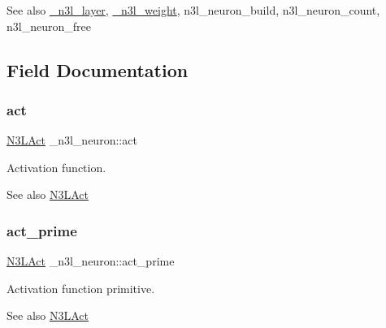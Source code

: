 \begin{DoxySeeAlso}{See also}
\hyperlink{struct__n3l__layer}{\+\_\+n3l\+\_\+layer}, \hyperlink{struct__n3l__weight}{\+\_\+n3l\+\_\+weight}, n3l\+\_\+neuron\+\_\+build, n3l\+\_\+neuron\+\_\+count, n3l\+\_\+neuron\+\_\+free 
\end{DoxySeeAlso}


\subsection{Field Documentation}
\mbox{\label{struct__n3l__neuron_a3ed17ddbe86d42ed6b7d31256b109262}} 
\subsubsection{\texorpdfstring{act}{act}}
{\footnotesize\ttfamily \hyperlink{n3__header_8h_afb10e6f7012513b51225a4d3add36cae}{N3\+L\+Act} \+\_\+n3l\+\_\+neuron\+::act}

Activation function. \begin{DoxySeeAlso}{See also}
\hyperlink{n3__header_8h_afb10e6f7012513b51225a4d3add36cae}{N3\+L\+Act} 
\end{DoxySeeAlso}
\mbox{\label{struct__n3l__neuron_a9c9de65191cb097fd7a71752c83fc3db}} 
\subsubsection{\texorpdfstring{act\+\_\+prime}{act\_prime}}
{\footnotesize\ttfamily \hyperlink{n3__header_8h_afb10e6f7012513b51225a4d3add36cae}{N3\+L\+Act} \+\_\+n3l\+\_\+neuron\+::act\+\_\+prime}

Activation function primitive. \begin{DoxySeeAlso}{See also}
\hyperlink{n3__header_8h_afb10e6f7012513b51225a4d3add36cae}{N3\+L\+Act} 
\end{DoxySeeAlso}
\mbox{\label{struct__n3l__neuron_af424e7accb8d1d089b828a1de69e03a0}} 

